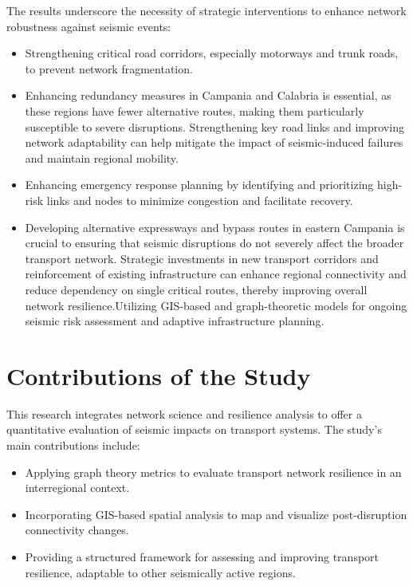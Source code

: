 The results underscore the necessity of strategic interventions to enhance network robustness against seismic events:

\begin{itemize}
    \item Strengthening critical road corridors, especially motorways and trunk roads, to prevent network fragmentation.
    \item Enhancing redundancy measures in Campania and Calabria is essential, as these regions have fewer alternative routes, making them particularly susceptible to severe disruptions. Strengthening key road links and improving network adaptability can help mitigate the impact of seismic-induced failures and maintain regional mobility.
    \item Enhancing emergency response planning by identifying and prioritizing high-risk links and nodes to minimize congestion and facilitate recovery.
    \item Developing alternative expressways and bypass routes in eastern Campania is crucial to ensuring that seismic disruptions do not severely affect the broader transport network. Strategic investments in new transport corridors and reinforcement of existing infrastructure can enhance regional connectivity and reduce dependency on single critical routes, thereby improving overall network resilience.Utilizing GIS-based and graph-theoretic models for ongoing seismic risk assessment and adaptive infrastructure planning.
    
\end{itemize}

\section{Contributions of the Study}
This research integrates network science and resilience analysis to offer a quantitative evaluation of seismic impacts on transport systems. The study’s main contributions include:

\begin{itemize}
    \item Applying graph theory metrics to evaluate transport network resilience in an interregional context.
    \item Incorporating GIS-based spatial analysis to map and visualize post-disruption connectivity changes.
    \item Providing a structured framework for assessing and improving transport resilience, adaptable to other seismically active regions.
\end{itemize}

